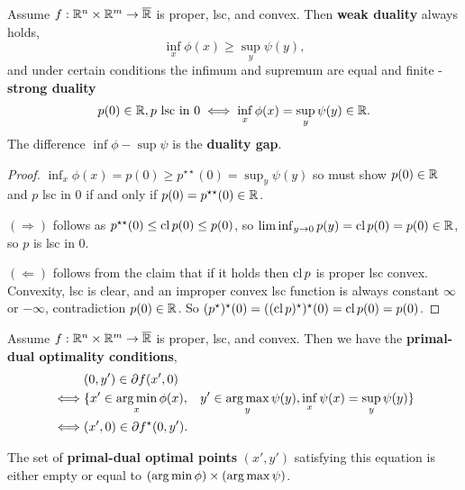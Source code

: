 \begin{thm}
  \label{sec:duality-optimization-4}
  Assume $f: \mathbb{R}^{n} \times \mathbb{R}^{m} \rightarrow \overline {\mathbb{R}}$ is proper,
  lsc, and convex. Then \textbf{weak duality} always holds,
  \begin{equation}
    \label{eq:40}
    \inf_{x} \phi(x) \geq \sup_{y} \psi(y),
  \end{equation} and under certain conditions the infimum and supremum
  are equal and finite - \textbf{strong duality}
  \begin{equation}
    \label{eq:41}
    p(0) \in \mathbb{R}, \text{$p$ lsc in $0$} \iff \inf_{x} \phi(x) =
    \sup_{y} \psi(y) \in \mathbb{R}.
  \end{equation}
  The difference $\inf \phi - \sup \psi$ is the \textbf{duality gap}.
\end{thm}

\begin{proof}
  $\inf_{x} \phi(x) = p(0) \geq p^{\star \star}(0) = \sup_{y} \psi(y)$
  so must show $p(0) \in \mathbb{R}$ and $p$ lsc in $0$ if and only if $p(0) =
  p^{\star \star}(0) \in \mathbb{R}$.

  $(\Rightarrow)$ follows as $p^{\star \star}(0) \leq \operatorname*{cl} p(0) \leq
  p(0)$, so $\liminf_{y \rightarrow 0} p(y) = \operatorname*{cl} p(0) = p(0) \in \mathbb{R}$,
  so $p$ is lsc in $0$.

  $(\Leftarrow)$ follows from the claim that if it holds then $\operatorname*{cl} p$
  is proper lsc convex.  Convexity, lsc is clear, and an improper
  convex lsc function is always constant $\infty$ or $-\infty$,
  contradiction $p(0) \in \mathbb{R}$. So $(p^{\star})^{\star}(0) = ((\operatorname*{cl}
  p)^{\star})^{\star}(0) = \operatorname*{cl} p(0) = p(0)$.
\end{proof}

\begin{thm}
  \label{sec:duality-optimization-5}
  Assume $f: \mathbb{R}^{n} \times \mathbb{R}^{m} \rightarrow \overline {\mathbb{R}}$ is proper,
  lsc, and convex.  Then we have the \textbf{primal-dual optimality
    conditions},
  \begin{align}
    \label{eq:42}
    &(0, y') \in \partial f(x', 0) \\
    \iff &\{ x' \in \operatorname*{arg\,min}_{x} \phi(x),
    &y' \in \operatorname*{arg\,max}_{y} \psi(y), \inf_{x} \psi(x) = \sup_{y} \psi(y) \} \\
    \iff &(x', 0) \in \partial f^{\star}(0, y').
  \end{align}

  The set of \textbf{primal-dual optimal points} $(x', y')$ satisfying
  this equation is either empty or equal to $(\operatorname*{arg\,min} \phi) \times
  (\operatorname*{arg\,max} \psi)$.
\end{thm}

